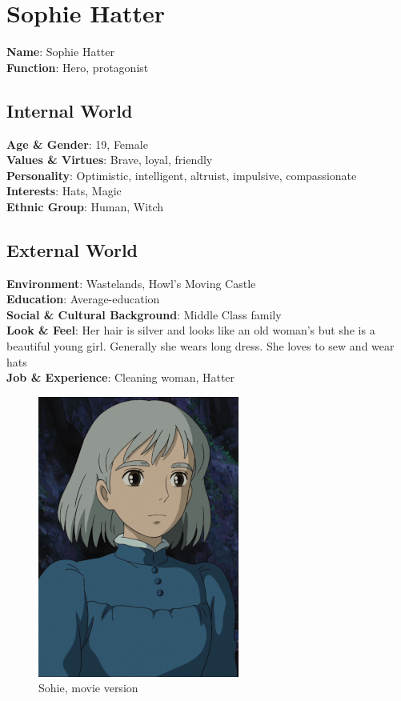 \section{Sophie Hatter}

\begin{minipage}{0.5\textwidth}
\textbf{Name}: Sophie Hatter \\
\textbf{Function}: Hero, protagonist

\subsection{Internal World}

\textbf{Age \& Gender}: 19, Female \\
\textbf{Values \& Virtues}: Brave, loyal, friendly \\
\textbf{Personality}: Optimistic, intelligent, altruist, impulsive, compassionate \\
\textbf{Interests}: Hats, Magic \\
\textbf{Ethnic Group}: Human, Witch

\subsection{External World}
\textbf{Environment}: Wastelands, Howl’s Moving Castle \\
\textbf{Education}: Average-education \\
\textbf{Social \& Cultural Background}: Middle Class family \\
\textbf{Look \& Feel}: Her hair is silver and looks like an old woman’s but she is a beautiful young girl. Generally she wears long dress. She loves to sew and wear hats \\
\textbf{Job \& Experience}: Cleaning woman, Hatter \\

\end{minipage}%
%
\hfill\begin{minipage}{0.4\textwidth}
\begin{figure}[H]
  \includegraphics{Images/Characters/sophie}
  \caption{Sohie, movie version}
  \end{figure}
\end{minipage}

